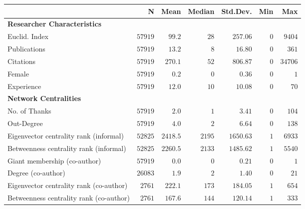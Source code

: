 \begin{tabular}{lrrrrrr}
\toprule
&N&Mean&Median&Std.Dev.&Min&Max\tabularnewline
\midrule
\textbf{Researcher Characteristics}\\
Euclid. Index&$57919$&$  99.2$&$  28$&$ 257.06$&$0$&$ 9404$\tabularnewline
Publications&$57919$&$  13.2$&$   8$&$  16.80$&$0$&$  361$\tabularnewline
Citations&$57919$&$ 270.1$&$  52$&$ 806.87$&$0$&$34706$\tabularnewline
Female&$57919$&$   0.2$&$   0$&$   0.36$&$0$&$    1$\tabularnewline
Experience&$57919$&$  12.0$&$  10$&$  10.08$&$0$&$   70$\tabularnewline
\midrule\textbf{Network Centralities}\\
No. of Thanks&$57919$&$   2.0$&$   1$&$   3.41$&$0$&$  104$\tabularnewline
Out-Degree&$57919$&$   4.0$&$   2$&$   6.64$&$0$&$  138$\tabularnewline
Eigenvector centrality rank (informal)&$52825$&$2418.5$&$2195$&$1650.63$&$1$&$ 6933$\tabularnewline
Betweenness centrality rank (informal)&$52825$&$2260.5$&$2133$&$1485.62$&$1$&$ 5540$\tabularnewline
Giant membership (co-author)&$57919$&$   0.0$&$   0$&$   0.21$&$0$&$    1$\tabularnewline
Degree (co-author)&$26083$&$   1.9$&$   2$&$   1.40$&$0$&$   21$\tabularnewline
Eigenvector centrality rank (co-author)&$ 2761$&$ 222.1$&$ 173$&$ 184.05$&$1$&$  654$\tabularnewline
Betweenness centrality rank (co-author)&$ 2761$&$ 167.6$&$ 144$&$ 120.14$&$1$&$  333$\tabularnewline
\bottomrule
\end{tabular}
